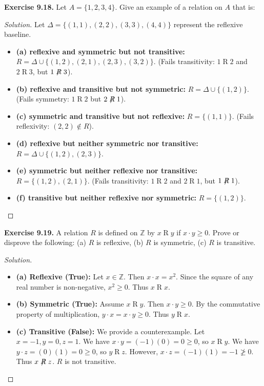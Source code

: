 \documentclass[11pt, a4paper]{article}
\theoremstyle{definition}
\theoremstyle{remark}
\newcommand{\Z}{\mathbb{Z}}
\begin{document}
\vspace{1em}
\textbf{Exercise 9.18.} Let $A = \{1, 2, 3, 4\}$. Give an example of a relation on $A$ that is:
\begin{proof}[Solution]
Let $\Delta = \{(1,1), (2,2), (3,3), (4,4)\}$ represent the reflexive baseline.
\begin{itemize}
    \item \textbf{(a) reflexive and symmetric but not transitive:} $R = \Delta \cup \{(1,2), (2,1), (2,3), (3,2)\}$. (Fails transitivity: $1 \mathrel{R} 2$ and $2 \mathrel{R} 3$, but $1 \not\mathrel{R} 3$).
    \item \textbf{(b) reflexive and transitive but not symmetric:} $R = \Delta \cup \{(1,2)\}$. (Fails symmetry: $1 \mathrel{R} 2$ but $2 \not\mathrel{R} 1$).
    \item \textbf{(c) symmetric and transitive but not reflexive:} $R = \{(1,1)\}$. (Fails reflexivity: $(2,2) \notin R$).
    \item \textbf{(d) reflexive but neither symmetric nor transitive:} $R = \Delta \cup \{(1,2), (2,3)\}$.
    \item \textbf{(e) symmetric but neither reflexive nor transitive:} $R = \{(1,2), (2,1)\}$. (Fails transitivity: $1 \mathrel{R} 2$ and $2 \mathrel{R} 1$, but $1 \not\mathrel{R} 1$).
    \item \textbf{(f) transitive but neither reflexive nor symmetric:} $R = \{(1,2)\}$.
\end{itemize}
\end{proof}

\vspace{1em}
\textbf{Exercise 9.19.} A relation $R$ is defined on $\Z$ by $x \mathrel{R} y$ if $x \cdot y \ge 0$. Prove or disprove the following: (a) $R$ is reflexive, (b) $R$ is symmetric, (c) $R$ is transitive.
\begin{proof}[Solution]
\begin{itemize}
    \item \textbf{(a) Reflexive (True):} Let $x \in \Z$. Then $x \cdot x = x^2$. Since the square of any real number is non-negative, $x^2 \ge 0$. Thus $x \mathrel{R} x$.
    \item \textbf{(b) Symmetric (True):} Assume $x \mathrel{R} y$. Then $x \cdot y \ge 0$. By the commutative property of multiplication, $y \cdot x = x \cdot y \ge 0$. Thus $y \mathrel{R} x$.
    \item \textbf{(c) Transitive (False):} We provide a counterexample. Let $x = -1, y = 0, z = 1$. 
    We have $x \cdot y = (-1)(0) = 0 \ge 0$, so $x \mathrel{R} y$. 
    We have $y \cdot z = (0)(1) = 0 \ge 0$, so $y \mathrel{R} z$. 
    However, $x \cdot z = (-1)(1) = -1 \not\ge 0$. Thus $x \not\mathrel{R} z$. $R$ is not transitive.
\end{itemize}
\end{proof}
\end{document}
